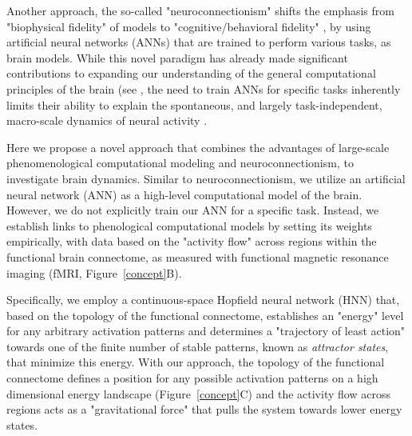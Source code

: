 \documentclass{article}
\begin{document}
Another approach, the so-called "neuroconnectionism" \citep{doerig2023neuroconnectionist} shifts the emphasis from "biophysical fidelity" of models to "cognitive/behavioral fidelity"
\citep{kriegeskorte2018cognitive}, by using artificial neural networks (ANNs) that are trained to
perform various tasks, as brain models. While this novel paradigm has already made significant contributions to expanding our understanding of the general computational principles of the brain (see \citep{doerig2023neuroconnectionist}, the need to train ANNs for specific tasks inherently limits their ability to explain the spontaneous, and largely task-independent, macro-scale dynamics of neural activity \citep{richards2019deep}.

Here we propose a novel approach that combines the advantages of large-scale phenomenological computational modeling and neuroconnectionism, to investigate brain dynamics.
Similar to neuroconnectionism, we utilize an artificial neural network (ANN) as a high-level computational model of the brain.
However, we do not explicitly train our ANN for a specific task. Instead, we establish links to phenological computational models by setting its weights empirically, with data based on the "activity flow" \citep{cole2016activity, ito2017cognitive}
across regions within the functional brain connectome, as measured with functional magnetic resonance imaging
(fMRI, Figure~\ref{concept}B).

Specifically, we employ a continuous-space Hopfield neural network (HNN) \citep{hopfield1982neural, krotov2023new} that, based on the topology of the functional connectome, establishes an "energy" level for any arbitrary activation patterns and determines a "trajectory of least action" towards one of the finite number of stable patterns, known as \textit{attractor states}, that minimize this energy.
With our approach, the topology of the functional connectome defines a position for any possible activation patterns on a high dimensional energy landscape (Figure~\ref{concept}C) and the activity flow across regions acts as a "gravitational force" that pulls the system towards lower energy states.
\end{document}
